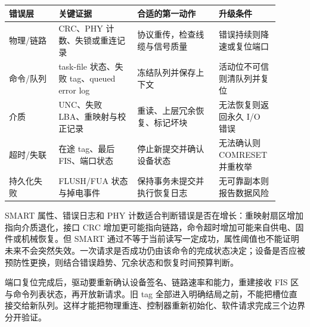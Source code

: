 \begin{longtable}{L{0.17\linewidth}L{0.27\linewidth}L{0.28\linewidth}L{0.18\linewidth}}
\toprule
错误层 & 关键证据 & 合适的第一动作 & 升级条件 \\
\midrule
物理/链路 & CRC、PHY 计数、失锁或重连记录 & 协议重传，检查线缆与信号质量 & 错误持续则降速或复位端口 \\\tablerowrule
命令/队列 & task-file 状态、失败 tag、queued error log & 冻结队列并保存上下文 & 活动位不可信则清队列并复位 \\\tablerowrule
介质 & UNC、失败 LBA、重映射与校正记录 & 重读、上层冗余恢复、标记坏块 & 无法恢复则返回永久 I/O 错误 \\\tablerowrule
超时/失联 & 在途 tag、最后 FIS、端口状态 & 停止新提交并确认设备状态 & 无法确认则 COMRESET 并重枚举 \\\tablerowrule
持久化失败 & FLUSH/FUA 状态与掉电事件 & 保持事务未提交并执行恢复日志 & 无可靠副本则报告数据风险 \\
\bottomrule
\end{longtable}


SMART 属性、错误日志和 PHY 计数适合判断错误是否在增长：重映射扇区增加指向介质退化，接口 CRC 增加更可能指向链路，命令超时增加可能来自供电、固件或机械恢复。但 SMART 通过不等于当前读写一定成功，属性阈值也不能证明未来不会突然失效。一次请求是否成功仍由该命令的完成状态决定；设备是否应被预防性更换，则结合错误趋势、冗余状态和恢复时间预算判断。

端口复位完成后，驱动要重新确认设备签名、链路速率和能力，重建接收 FIS 区与命令列表状态，再开放新请求。旧 tag 全部进入明确结局之前，不能把槽位直接交给新队列。这样才能把物理重连、控制器重新初始化、软件请求完成三个边界分开验证。
